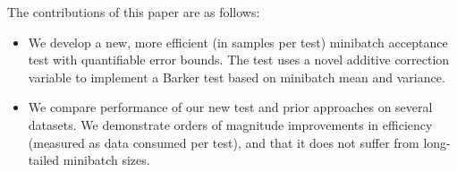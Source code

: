 \documentclass[twoside]{article} \usepackage{aistats2017}
\begin{document}


The contributions of this paper are as follows:

\begin{itemize}[noitemsep]
    \item We develop a new, more efficient (in samples per test) minibatch
    acceptance test with quantifiable error bounds. The test uses a novel
    additive correction variable to implement a Barker test based on minibatch
    mean and variance. 


    \item We compare performance of our new test and prior approaches on several
    datasets. We demonstrate orders of magnitude improvements in efficiency
    (measured as data consumed per test), and that it does not suffer from
    long-tailed minibatch sizes.
\end{itemize}
\end{document}
